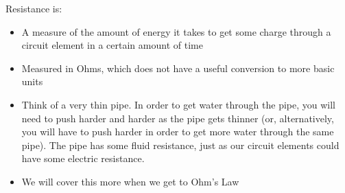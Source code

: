 Resistance is:
\begin{itemize}
\item A measure of the amount of energy it takes to get some charge through a circuit element in a certain amount of time
\item Measured in Ohms, which does not have a useful conversion to more basic units
\item Think of a very thin pipe. In order to get water through the pipe, you will need to push harder and harder as the pipe gets thinner (or, alternatively, you will have to push harder in order to get more water through the same pipe).  The pipe has some fluid resistance, just as our circuit elements could have some electric resistance.
\item We will cover this more when we get to Ohm's Law
\end{itemize}
